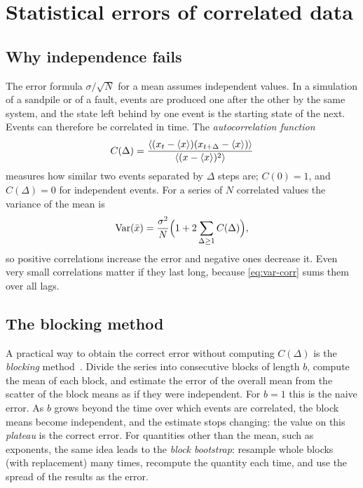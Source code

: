 \section{Statistical errors of correlated data}
\label{sec:correlated}

\subsection{Why independence fails}

The error formula $\sigma/\sqrt N$ for a mean assumes independent values. In a simulation of a sandpile or of a fault, events are
produced one after the other by the same system, and the state left behind by one event is the starting state of the next. Events
can therefore be correlated in time. The \emph{autocorrelation function}
\begin{equation}
  C(\Delta) = \frac{\left\langle (x_t-\left\langle x \right\rangle)(x_{t+\Delta}-\left\langle x \right\rangle) \right\rangle}{\left\langle (x-\left\langle x \right\rangle)^2 \right\rangle}
\end{equation}
measures how similar two events separated by $\Delta$ steps are; $C(0)=1$, and $C(\Delta)=0$ for independent events. For a series
of $N$ correlated values the variance of the mean is
\begin{equation}
  \mathrm{Var}(\bar x) = \frac{\sigma^2}{N}\Bigl(1 + 2\sum_{\Delta\ge1} C(\Delta)\Bigr),
  \label{eq:var-corr}
\end{equation}
so positive correlations increase the error and negative ones decrease it. Even very small correlations matter if they last
long, because \cref{eq:var-corr} sums them over all lags.

\subsection{The blocking method}

A practical way to obtain the correct error without computing $C(\Delta)$ is the \emph{blocking} method~\cite{FlyvbjergPetersen1989}.
Divide the series into consecutive blocks of length $b$, compute the mean of each block, and estimate the error of the overall
mean from the scatter of the block means as if they were independent. For $b=1$ this is the naive error. As $b$ grows beyond the
time over which events are correlated, the block means become independent, and the estimate stops changing: the value on this
\emph{plateau} is the correct error. For quantities other than the mean, such as exponents, the same idea leads to the \emph{block
bootstrap}: resample whole blocks (with replacement) many times, recompute the quantity each time, and use the spread of the
results as the error.

